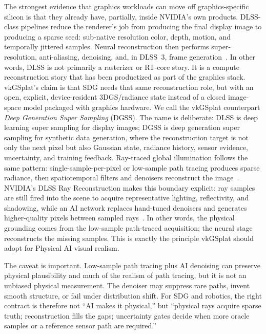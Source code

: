 \documentclass[10pt,journal,onecolumn]{IEEEtran}
\begin{document}
The strongest evidence that graphics workloads can move off
graphics-specific silicon is that they already have, partially, inside
NVIDIA's own products. DLSS-class pipelines reduce the renderer's job
from producing the final display image to producing a sparse seed:
sub-native resolution color, depth, motion, and temporally jittered
samples. Neural reconstruction then performs super-resolution,
anti-aliasing, denoising, and, in DLSS~3, frame
generation~\cite{nvidia-dlss,liu2020nsrr,edelsten2019dlss,nvidia-dlss3}.
In other words, DLSS is not primarily a rasterizer or RT-core story. It is a
compute reconstruction story that has been productized as part of the graphics
stack. vkGSplat's claim is that SDG needs that same reconstruction role, but
with an open, explicit, device-resident 3DGS/radiance state instead of a closed
image-space model packaged with graphics hardware. We call the vkGSplat
counterpart \emph{Deep Generation Super Sampling} (DGSS). The name is deliberate:
DLSS is deep learning super sampling for display images; DGSS is deep generation
super sampling for synthetic data generation, where the reconstruction target is
not only the next pixel but also Gaussian state, radiance history, sensor
evidence, uncertainty, and training feedback.
Ray-traced global illumination follows the same pattern:
single-sample-per-pixel or low-sample path tracing produces sparse
radiance, then spatiotemporal filters and denoisers reconstruct the
image~\cite{schied2017svgf,chaitanya2017interactive,nvidia-nrd,bitterli2020restir}.
NVIDIA's DLSS Ray Reconstruction makes this boundary explicit: ray samples are
still fired into the scene to acquire representative lighting, reflectivity,
and shadowing, while an AI network replaces hand-tuned denoisers and generates
higher-quality pixels between sampled rays~\cite{nvidia-dlss35rr}. In other
words, the physical grounding comes from the low-sample path-traced acquisition;
the neural stage reconstructs the missing samples. This is exactly the
principle vkGSplat should adopt for Physical AI visual realism.

The caveat is important. Low-sample path tracing plus AI denoising can preserve
physical plausibility and much of the realism of path tracing, but it is not an
unbiased physical measurement. The denoiser may suppress rare paths, invent
smooth structure, or fail under distribution shift. For SDG and robotics, the
right contract is therefore not ``AI makes it physical,'' but ``physical rays
acquire sparse truth; reconstruction fills the gaps; uncertainty gates decide
when more oracle samples or a reference sensor path are required.''
\end{document}
